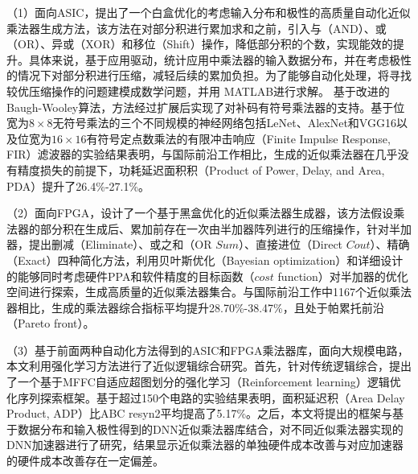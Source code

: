 （1）面向ASIC，提出了一个白盒优化的考虑输入分布和极性的高质量自动化近似乘法器生成方法，该方法在对部分积进行累加求和之前，引入与（AND）、或（OR）、异或（XOR）和移位（Shift）操作，降低部分积的个数，实现能效的提升。具体来说，基于应用驱动，统计应用中乘法器的输入数据分布，并在考虑极性的情况下对部分积进行压缩，减轻后续的累加负担。为了能够自动化处理，将寻找较优压缩操作的问题建模成数学问题，并用 MATLAB进行求解。
基于改进的Baugh-Wooley算法\cite{EM:baugh-wooley,EM:baugh-wooley_modified_PP_reorga,EM:baugh-wooley_diff}，方法经过扩展后实现了对补码有符号乘法器的支持。基于位宽为$8\times8$无符号乘法的三个不同规模的神经网络包括LeNet、AlexNet和VGG16以及位宽为$16\times16$有符号定点数乘法的有限冲击响应（Finite Impulse Response, FIR）滤波器的实验结果表明，与国际前沿工作相比，生成的近似乘法器在几乎没有精度损失的前提下，功耗延迟面积积（Product of Power, Delay, and Area, PDA）提升了26.4\%-27.1\%。

（2）面向FPGA，设计了一个基于黑盒优化的近似乘法器生成器，该方法假设乘法器的部分积在生成后、累加前存在一次由半加器阵列进行的压缩操作，针对半加器，提出删减（Eliminate）、或之和（OR $Sum$）、直接进位（Direct $Cout$）、精确（Exact）四种简化方法，利用贝叶斯优化（Bayesian optimization）和详细设计的能够同时考虑硬件PPA和软件精度的目标函数（$cost$ function）对半加器的优化空间进行探索，生成高质量的近似乘法器集合。与国际前沿工作中1167个近似乘法器相比，生成的乘法器综合指标平均提升28.70\%-38.47\%，且处于帕累托前沿（Pareto front）。

（3）基于前面两种自动化方法得到的ASIC和FPGA乘法器库，面向大规模电路，本文利用强化学习方法进行了近似逻辑综合研究。首先，针对传统逻辑综合，提出了一个基于MFFC自适应超图划分的强化学习（Reinforcement learning）逻辑优化序列探索框架。基于超过150个电路的实验结果表明，面积延迟积（Area Delay Product, ADP）比ABC\cite{LS:ABC} resyn2平均提高了5.17\%。之后，本文将提出的框架与基于数据分布和输入极性得到的DNN近似乘法器库结合，对不同近似乘法器实现的DNN加速器进行了研究，结果显示近似乘法器的单独硬件成本改善与对应加速器的硬件成本改善存在一定偏差。

